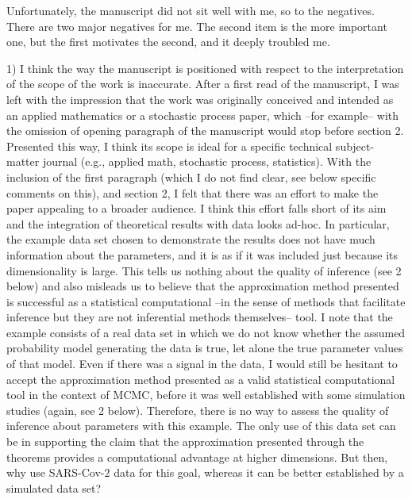 \documentclass[12pt]{article}
\begin{document}
Unfortunately, the manuscript did not sit well with me, so to the negatives. There are two major negatives for me. The second item is the more important one, but the first motivates the second, and it deeply troubled me. 

1) I think the way the manuscript is positioned with respect to the interpretation of the scope of the work is inaccurate. After a first read of the manuscript, I was left with the impression that the work was originally conceived and intended as an applied mathematics or a stochastic process paper, which --for example-- with the omission of opening paragraph of the manuscript would stop before section 2. Presented this way, I think its scope is ideal for a specific technical subject-matter journal (e.g., applied math, stochastic process, statistics). With the inclusion of the first paragraph (which I do not find clear, see below specific comments on this), and section 2, I felt that there was an effort to make the paper appealing to a broader audience. I think this effort falls short of its aim and the integration of theoretical results with data looks ad-hoc. In particular, the example data set chosen to demonstrate the results does not have much information about the parameters, and it is as if it was included just because its dimensionality is large. This tells us nothing about the quality of inference (see 2 below) and also misleads us to believe that the approximation method presented is successful as a statistical computational --in the sense of methods that facilitate inference but they are not inferential methods themselves-- tool. I note that the example consists of a real data set in which we do not know whether the assumed probability model generating the data is true, let alone the true parameter values of that model. Even if there was a signal in the data, I would still be hesitant to accept the approximation method presented as a valid statistical computational tool in the context of MCMC, before it was well established with some simulation studies (again, see 2 below). Therefore, there is no way to assess the quality of inference about parameters with this example. The only use of this data set can be in supporting the claim that the approximation presented through the theorems provides a computational advantage at higher dimensions. But then, why use SARS-Cov-2 data for this goal, whereas it can be better established by a simulated data set? 
\end{document}

